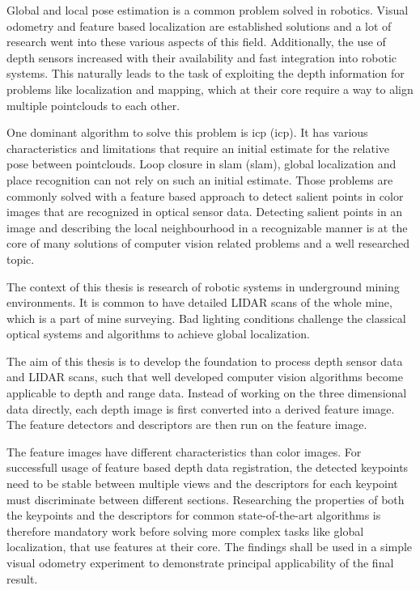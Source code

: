 Global and local pose estimation is a common problem solved in robotics.
Visual odometry\cite{he_tvc2019} and feature based localization\cite{sattler_cvpr2018} are established solutions and a lot of research went into these various aspects of this field.
Additionally, the use of depth sensors increased with their availability and fast integration into robotic systems.
This naturally leads to the task of exploiting the depth information for problems like localization and mapping, which at their core require a way to align multiple pointclouds to each other.

One dominant algorithm to solve this problem is \acrshort{icp} (\acrlong{icp})\cite{besl_pami1992}.
It has various characteristics and limitations that require an initial estimate for the relative pose between pointclouds.
Loop closure in \acrshort{slam} (\acrlong{slam})\cite{ho_ros2006}, global localization and place recognition\cite{sattler_2011} can not rely on such an initial estimate.
Those problems are commonly solved with a feature based approach to detect salient points in color images that are recognized in optical sensor data.
Detecting salient points in an image and describing the local neighbourhood in a recognizable manner is at the core of many solutions of computer vision related problems and a well researched topic.

The context of this thesis is research of robotic systems in underground mining environments.
It is common to have detailed \acrshort{LIDAR} scans of the whole mine, which is a part of mine surveying.
Bad lighting conditions challenge the classical optical systems and algorithms to achieve global localization.

The aim of this thesis is to develop the foundation to process depth sensor data and \acrshort{LIDAR} scans, such that well developed computer vision algorithms become applicable to depth and range data.
Instead of working on the three dimensional data directly, each depth image is first converted into a derived feature image.
The feature detectors and descriptors are then run on the feature image.

The feature images have different characteristics than color images.
For successfull usage of feature based depth data registration, the detected keypoints need to be stable between multiple views and the descriptors for each keypoint must discriminate between different sections.
Researching the properties of both the keypoints and the descriptors for common state-of-the-art algorithms is therefore mandatory work before solving more complex tasks like global localization, that use features at their core.
The findings shall be used in a simple visual odometry experiment to demonstrate principal applicability of the final result.

